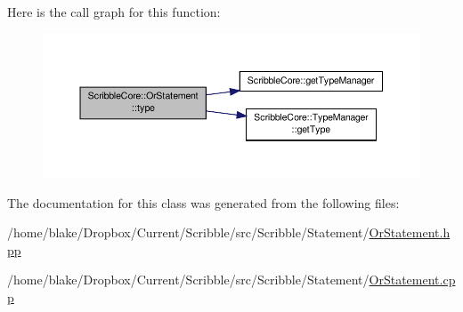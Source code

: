 Here is the call graph for this function\-:
\nopagebreak
\begin{figure}[H]
\begin{center}
\leavevmode
\includegraphics[width=350pt]{class_scribble_core_1_1_or_statement_a1b5189b085d975ed9f904a7307b912d1_cgraph}
\end{center}
\end{figure}




The documentation for this class was generated from the following files\-:\begin{DoxyCompactItemize}
\item 
/home/blake/\-Dropbox/\-Current/\-Scribble/src/\-Scribble/\-Statement/\hyperlink{_or_statement_8hpp}{Or\-Statement.\-hpp}\item 
/home/blake/\-Dropbox/\-Current/\-Scribble/src/\-Scribble/\-Statement/\hyperlink{_or_statement_8cpp}{Or\-Statement.\-cpp}\end{DoxyCompactItemize}
